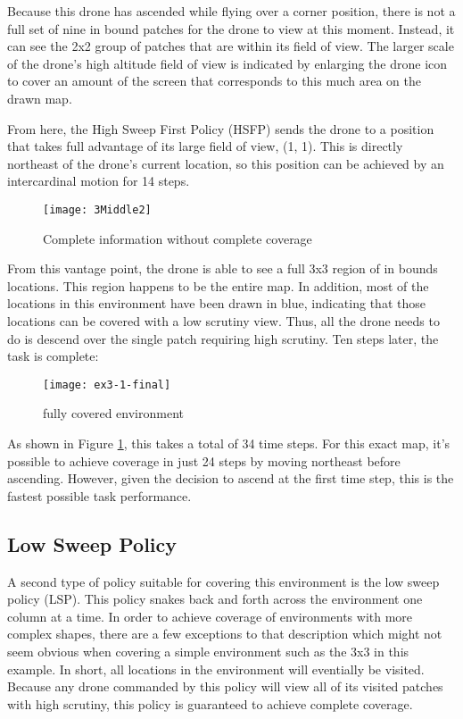 Because this drone has ascended while flying over a corner position, there is not a full set of nine in bound patches for the drone to view at this moment. Instead, it can see the 2x2 group of patches that are within its field of view. The larger scale of the drone's high altitude field of view is indicated by enlarging the drone icon to cover an amount of the screen that corresponds to this much area on the drawn map.

From here, the High Sweep First Policy (HSFP) sends the drone to a position that takes full advantage of its large field of view, (1, 1). This is directly northeast of the drone's current location, so this position can be achieved by an intercardinal motion for 14 steps.

\begin{figure}[H]
\texttt{[image: 3Middle2]}
\caption[Complete information without complete coverage]{Complete information without complete coverage}
\end{figure}

From this vantage point, the drone is able to see a full 3x3 region of in bounds locations. This region happens to be the entire map. In addition, most of the locations in this environment have been drawn in blue, indicating that those locations can be covered with a low scrutiny view. Thus, all the drone needs to do is descend over the single patch requiring high scrutiny. Ten steps later, the task is complete:

\begin{figure}[H]
\texttt{[image: ex3-1-final]}
\caption[Fully Covered Envrionment]{fully covered environment}
\label{fig:3-1-end}
\end{figure}

As shown in Figure \ref{fig:3-1-end}, this takes a total of 34 time steps. For this exact map, it's possible to achieve coverage in just 24 steps by moving northeast before ascending. However, given the decision to ascend at the first time step, this is the fastest possible task performance.

\subsection{Low Sweep Policy}

A second type of policy suitable for covering this environment is the low sweep policy (LSP). This policy snakes back and forth across the environment one column at a time. In order to achieve coverage of environments with more complex shapes, there are a few exceptions to that description which might not seem obvious when covering a simple environment such as the 3x3 in this example. In short, all locations in the environment will eventially be visited. Because any drone commanded by this policy will view all of its visited patches with high scrutiny, this policy is guaranteed to achieve complete coverage.

